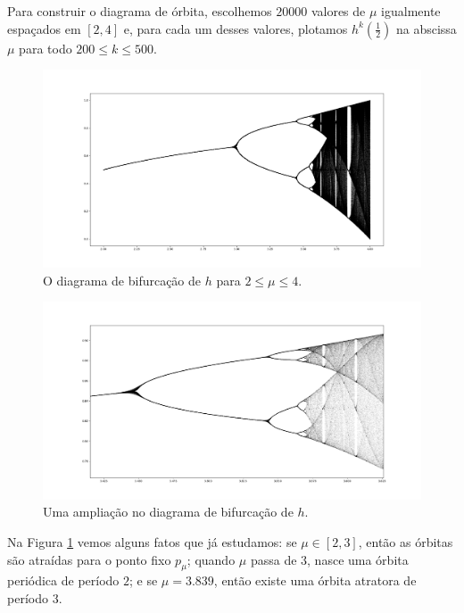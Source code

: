 Para construir o diagrama de órbita, escolhemos $20000$ valores de $\mu$ igualmente espaçados em $[2, 4]$ e, para cada um desses valores, plotamos $h^k(\frac{1}{2})$ na abscissa $\mu$ para todo $200 \leq k \leq 500$.

\begin{figure}[!htb]
\label{fig period-doubling}
\centering
\includegraphics[scale=0.25]{images/period-doubling.png}
\caption{O diagrama de bifurcação de $h$ para $2 \leq \mu \leq 4$.}
\end{figure}

\begin{figure}[!htb]
\label{fig period-doubling1}
\centering
\includegraphics[scale=0.25]{images/period-doubling1.png}
\caption{Uma ampliação no diagrama de bifurcação de $h$.}
\end{figure}

Na Figura \ref{fig period-doubling} vemos alguns fatos que já estudamos: se $\mu \in [2, 3]$, então as órbitas são atraídas para o ponto fixo $p_\mu$; quando $\mu$ passa de $3$, nasce uma órbita periódica de período $2$; e se $\mu = 3.839$, então existe uma órbita atratora de período $3$. 
